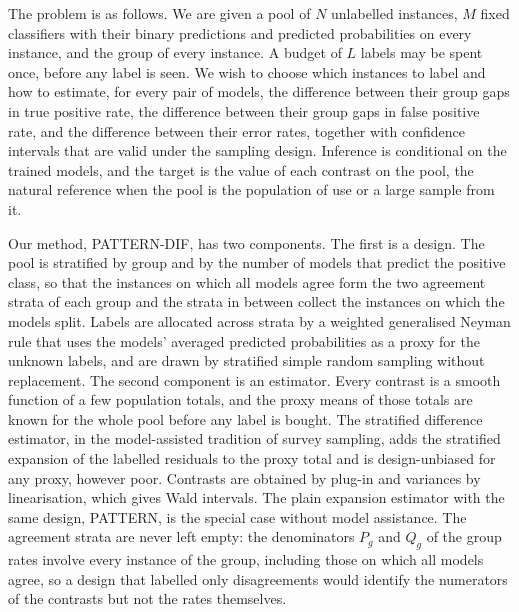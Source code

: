 \documentclass[pdflatex,sn-mathphys-num,iicol]{sn-jnl}
\theoremstyle{thmstyleone}
\theoremstyle{thmstyletwo}
\theoremstyle{thmstylethree}
\begin{document}
The problem is as follows. We are given a pool of $N$ unlabelled instances, $M$ fixed classifiers with their binary predictions and predicted probabilities on every instance, and the group of every instance. A budget of $L$ labels may be spent once, before any label is seen. We wish to choose which instances to label and how to estimate, for every pair of models, the difference between their group gaps in true positive rate, the difference between their group gaps in false positive rate, and the difference between their error rates, together with confidence intervals that are valid under the sampling design. Inference is conditional on the trained models, and the target is the value of each contrast on the pool, the natural reference when the pool is the population of use or a large sample from it.

Our method, PATTERN-DIF, has two components. The first is a design. The pool is stratified by group and by the number of models that predict the positive class, so that the instances on which all models agree form the two agreement strata of each group and the strata in between collect the instances on which the models split. Labels are allocated across strata by a weighted generalised Neyman rule that uses the models' averaged predicted probabilities as a proxy for the unknown labels, and are drawn by stratified simple random sampling without replacement. The second component is an estimator. Every contrast is a smooth function of a few population totals, and the proxy means of those totals are known for the whole pool before any label is bought. The stratified difference estimator, in the model-assisted tradition of survey sampling, adds the stratified expansion of the labelled residuals to the proxy total and is design-unbiased for any proxy, however poor. Contrasts are obtained by plug-in and variances by linearisation, which gives Wald intervals. The plain expansion estimator with the same design, PATTERN, is the special case without model assistance. The agreement strata are never left empty: the denominators $P_g$ and $Q_g$ of the group rates involve every instance of the group, including those on which all models agree, so a design that labelled only disagreements would identify the numerators of the contrasts but not the rates themselves.
\end{document}
